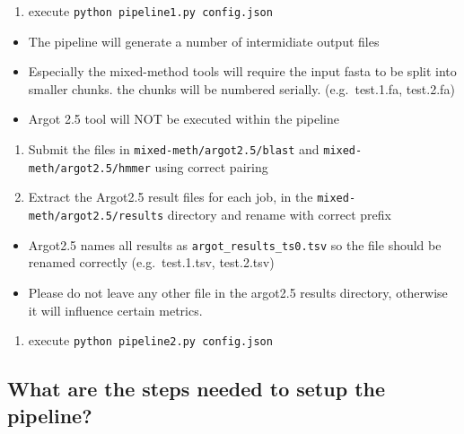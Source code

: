\begin{enumerate}
 \def\labelenumi{\arabic{enumi}.}
 \setcounter{enumi}{2}

 \item
       execute \texttt{python\ pipeline1.py\ config.json}
\end{enumerate}

\begin{itemize}

 \item
       The pipeline will generate a number of intermidiate output files
 \item
       Especially the mixed-method tools will require the input fasta to be
       split into smaller chunks. the chunks will be numbered serially.
       (e.g.~test.1.fa, test.2.fa)
 \item
       Argot 2.5 tool will NOT be executed within the pipeline
\end{itemize}

\begin{enumerate}
 \def\labelenumi{\arabic{enumi}.}
 \setcounter{enumi}{3}

 \item
       Submit the files in \texttt{mixed-meth/argot2.5/blast} and
       \texttt{mixed-meth/argot2.5/hmmer} using correct pairing
 \item
       Extract the Argot2.5 result files for each job, in the
       \texttt{mixed-meth/argot2.5/results} directory and rename with correct
       prefix
\end{enumerate}

\begin{itemize}

 \item
       Argot2.5 names all results as \texttt{argot\_results\_ts0.tsv} so the
       file should be renamed correctly (e.g.~test.1.tsv, test.2.tsv)
 \item
       Please do not leave any other file in the argot2.5 results directory,
       otherwise it will influence certain metrics.
\end{itemize}

\begin{enumerate}
 \def\labelenumi{\arabic{enumi}.}
 \setcounter{enumi}{5}

 \item
       execute \texttt{python\ pipeline2.py\ config.json}
\end{enumerate}

\subsection{What are the steps needed to setup the pipeline?}\label{what-are-the-steps-needed-to-setup-the-pipeline}

